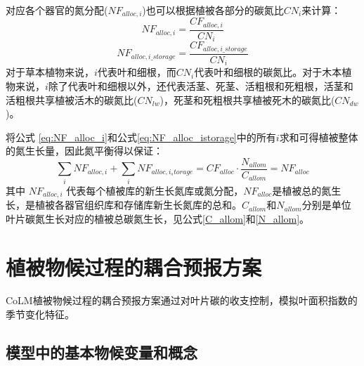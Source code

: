  对应各个器官的氮分配($NF_{alloc,i}$)也可以根据植被各部分的碳氮比$CN_i$来计算：
\begin{equation}\label{eq:NF_alloc_i}
  NF_{alloc,i} = \frac{CF_{alloc,i}}{CN_i}
\end{equation}
\begin{equation}\label{eq:NF_alloc_istorage}
  NF_{alloc,i\_storage} = \frac{CF_{alloc,i\_storage}}{CN_{i}}
\end{equation}
对于草本植物来说，$i$代表叶和细根，而$CN_{i}$代表叶和细根的碳氮比。对于木本植物来说，$i$除了代表叶和细根以外，还代表活茎、死茎、活粗根和死粗根，活茎和活粗根共享植被活木的碳氮比($CN_{lw}$)，死茎和死粗根共享植被死木的碳氮比($CN_{dw}$)。


将公式 \eqref{eq:NF_alloc_i}和公式\eqref{eq:NF_alloc_istorage}中的所有$i$求和可得植被整体的氮生长量，因此氮平衡得以保证：
\begin{equation}
  \sum_{i}{NF_{alloc,i}}+\sum_{i}{NF_{alloc,i_storage}}=CF_{alloc}\cdot \frac{N_{allom}}{C_{allom}}=NF_{alloc}
\end{equation}
其中 $NF_{alloc,i}$ 代表每个植被库的新生长氮库或氮分配，$NF_{alloc}$是植被总的氮生长，是植被各器官组织库和存储库新生长氮库的总和。$C_{allom}$和$N_{allom}$分别是单位叶片碳氮生长对应的植被总碳氮生长，见公式\eqref{C_allom}和\eqref{N_allom}。


\section{植被物候过程的耦合预报方案}\label{植被物候过程的耦合预报方案}
CoLM植被物候过程的耦合预报方案通过对叶片碳的收支控制，模拟叶面积指数的季节变化特征。


\subsection{模型中的基本物候变量和概念}\label{模型中的基本物候变量和概念}

